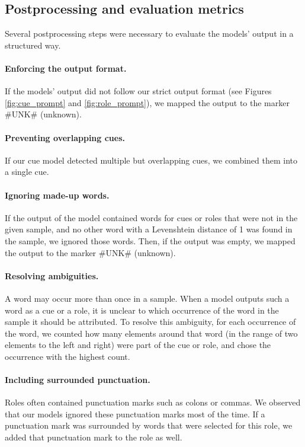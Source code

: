 \documentclass[11pt,a4paper]{article}
\begin{document}
\subsection{Postprocessing and evaluation metrics}
\label{sec:postprocessing}

Several postprocessing steps were necessary to evaluate the models' output in a structured way.

\paragraph{Enforcing the output format.} If the models' output did not follow our strict output format (see Figures \ref{fig:cue_prompt} and \ref{fig:role_prompt}), we mapped the output to the marker \#UNK\# (unknown).

\paragraph{Preventing overlapping cues.} If our cue model detected multiple but overlapping cues, we combined them into a single cue.

\paragraph{Ignoring made-up words.} If the output of the model contained words for cues or roles that were not in the given sample, and no other word with a Levenshtein distance of 1 was found in the sample, we ignored those words. Then, if the output was empty, we mapped the output to the marker \#UNK\# (unknown).

\paragraph{Resolving ambiguities.} A word may occur more than once in a sample.
When a model outputs such a word as a cue or a role, it is unclear to which occurrence of the word in the sample it should be attributed.
To resolve this ambiguity, for each occurrence of the word, we counted how many elements around that word (in the range of two elements to the left and right) were part of the cue or role, and chose the occurrence with the highest count.

\paragraph{Including surrounded punctuation.} Roles often contained punctuation marks such as colons or commas.
We observed that our models ignored these punctuation marks most of the time.
If a punctuation mark was surrounded by words that were selected for this role, we added that punctuation mark to the role as well.
\end{document}

